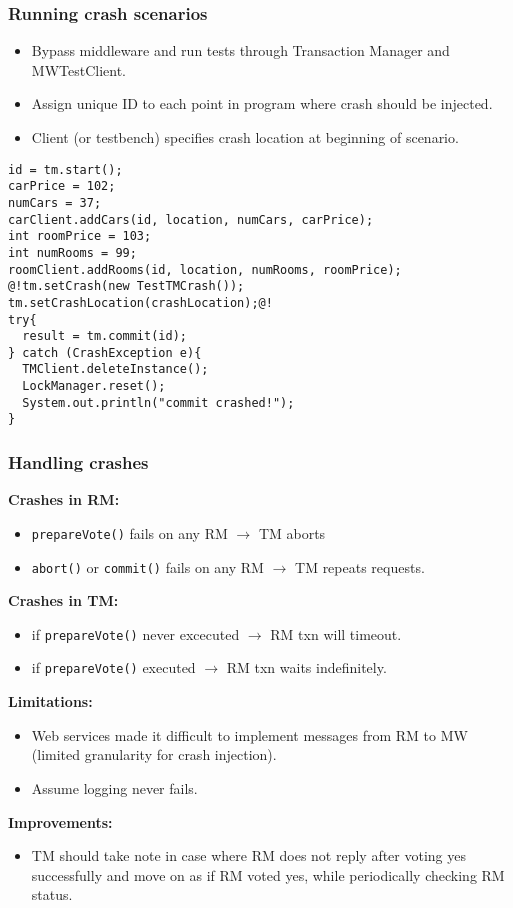 \documentclass[10pt]{beamer}
\begin{document}
\begin{frame}[fragile]
\frametitle{Running crash scenarios}
\begin{itemize}
  \item Bypass middleware and run tests through Transaction Manager and
  MWTestClient.
  \item Assign unique ID to each point in program where crash should be
  injected.
  \item Client (or testbench) specifies crash location at beginning of scenario.
\end{itemize}

\begin{lstlisting}
id = tm.start();
carPrice = 102;
numCars = 37;
carClient.addCars(id, location, numCars, carPrice);
int roomPrice = 103;
int numRooms = 99;
roomClient.addRooms(id, location, numRooms, roomPrice);
@!tm.setCrash(new TestTMCrash());
tm.setCrashLocation(crashLocation);@!
try{
  result = tm.commit(id);
} catch (CrashException e){
  TMClient.deleteInstance();
  LockManager.reset();
  System.out.println("commit crashed!");
}
\end{lstlisting}

\end{frame}

\begin{frame}
\frametitle{Handling crashes}
\textbf{Crashes in RM:}
\begin{itemize}
  \item \texttt{prepareVote()} fails on any RM $\rightarrow$ TM aborts
  \item \texttt{abort()} or \texttt{commit()} fails on any RM $\rightarrow$
  TM repeats requests.
\end{itemize}

\textbf{Crashes in TM:}
\begin{itemize}
  \item if \texttt{prepareVote()} never excecuted $\rightarrow$ RM txn will
  timeout.
  \item if \texttt{prepareVote()} executed $\rightarrow$ RM txn waits
  indefinitely.
\end{itemize}

\textbf{Limitations:}
\begin{itemize}
  \item Web services made it difficult to implement messages from RM to MW
  (limited granularity for crash injection).
  \item Assume logging never fails.
\end{itemize}
\textbf{Improvements:}
\begin{itemize}
  \item TM should take note in case where RM does not reply after voting yes
  successfully and move on as if RM voted yes, while periodically checking RM
  status.
\end{itemize}

\end{frame}
\end{document}
